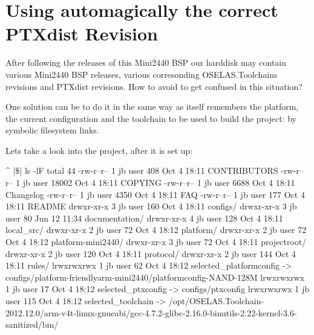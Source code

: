 %
%
%
%
%
%
%

\section{Using automagically the correct PTXdist Revision}	\label{sec:ptxdistreleases}

After following the releases of this Mini2440 BSP our harddisk may contain
various Mini2440 BSP releases, various corresonding OSELAS.Toolchains revisions
and PTXdist revisions. How to avoid to get confused in this situation?

One solution can be to do it in the same way as \ptxdist{} itself remembers the
platform, the current configuration and the toolchain to be used to build the
project: by symbolic filesystem links.

Lets take a look into the project, after it is set up:

\begin{ptxshell}[escapechar=|]{^}
|\$| ls -lF
total 44
-rw-r--r-- 1 jb user   408 Oct  4 18:11 CONTRIBUTORS
-rw-r--r-- 1 jb user 18002 Oct  4 18:11 COPYING
-rw-r--r-- 1 jb user  6688 Oct  4 18:11 Changelog
-rw-r--r-- 1 jb user  4350 Oct  4 18:11 FAQ
-rw-r--r-- 1 jb user   177 Oct  4 18:11 README
drwxr-xr-x 3 jb user   160 Oct  4 18:11 configs/
drwxr-xr-x 3 jb user    80 Jun 12 11:34 documentation/
drwxr-xr-x 4 jb user   128 Oct  4 18:11 local_src/
drwxr-xr-x 2 jb user    72 Oct  4 18:12 platform/
drwxr-xr-x 2 jb user    72 Oct  4 18:12 platform-mini2440/
drwxr-xr-x 3 jb user    72 Oct  4 18:11 projectroot/
drwxr-xr-x 2 jb user   120 Oct  4 18:11 protocol/
drwxr-xr-x 2 jb user   144 Oct  4 18:11 rules/
lrwxrwxrwx 1 jb user    62 Oct  4 18:12 selected_platformconfig -> configs/platform-friendlyarm-mini2440/platformconfig-NAND-128M
lrwxrwxrwx 1 jb user    17 Oct  4 18:12 selected_ptxconfig -> configs/ptxconfig
lrwxrwxrwx 1 jb user   115 Oct  4 18:12 selected_toolchain -> /opt/OSELAS.Toolchain-2012.12.0/arm-v4t-linux-gnueabi/gcc-4.7.2-glibc-2.16.0-binutils-2.22-kernel-3.6-sanitized/bin/
\end{ptxshell}

